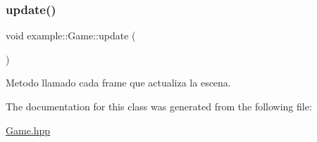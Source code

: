 \subsubsection{\texorpdfstring{update()}{update()}}
{\footnotesize\ttfamily void example\+::\+Game\+::update (\begin{DoxyParamCaption}{ }\end{DoxyParamCaption})}



Metodo llamado cada frame que actualiza la escena. 



The documentation for this class was generated from the following file\+:\begin{DoxyCompactItemize}
\item 
\mbox{\hyperlink{_game_8hpp}{Game.\+hpp}}\end{DoxyCompactItemize}
